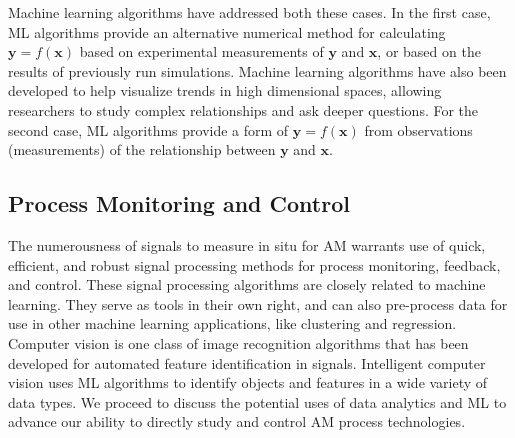 Machine learning algorithms have addressed both these cases. In the first case, ML algorithms provide an alternative numerical method for calculating $\mathbf{y} = f(\mathbf{x})$ based on experimental measurements of $\mathbf{y}$ and $\mathbf{x}$, or based on the results of previously run simulations. Machine learning algorithms have also been developed to help visualize trends in high dimensional spaces, allowing researchers to study complex relationships and ask deeper questions. For the second case, ML algorithms provide a form of $\mathbf{y} = f(\mathbf{x})$ from observations (measurements) of the relationship between $\mathbf{y}$ and $\mathbf{x}$.





\subsection{Process Monitoring and Control}

The numerousness of signals to measure in situ for AM warrants use of quick, efficient, and robust signal processing methods for process monitoring, feedback, and control. These signal processing algorithms are closely related to machine learning. They serve as tools in their own right, and can also pre-process data for use in other machine learning applications, like clustering and regression. Computer vision is one class of image recognition algorithms that has been developed for automated feature identification in signals. Intelligent computer vision uses ML algorithms to identify objects and features in a wide variety of data types. We proceed to discuss the potential uses of data analytics and ML to advance our ability to directly study and control AM process technologies.


